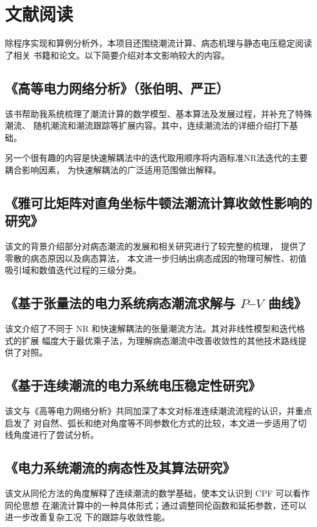 \section{文献阅读}
\label{sec:literature-review}

除程序实现和算例分析外，本项目还围绕潮流计算、病态机理与静态电压稳定阅读了相关
书籍和论文。以下简要介绍对本文影响较大的内容。

\subsection{《高等电力网络分析》（张伯明、严正）}

该书帮助我系统梳理了潮流计算的数学模型、基本算法及发展过程，并补充了特殊潮流、
随机潮流和潮流跟踪等扩展内容。其中，连续潮流法的详细介绍打下基础。

另一个很有趣的内容是快速解耦法中的迭代取用顺序将内涵标准NR法迭代的主要耦合影响因素，
为快速解耦法的广泛适用范围做出解释。

\subsection{《雅可比矩阵对直角坐标牛顿法潮流计算收敛性影响的研究》}

该文的背景介绍部分对病态潮流的发展和相关研究进行了较完整的梳理，
提供了零散的病态原因以及病态算法，
本文进一步归纳出病态成因的物理可解性、初值吸引域和数值迭代过程的三级分类。

\subsection{《基于张量法的电力系统病态潮流求解与 \(P\)--\(V\) 曲线》}

该文介绍了不同于 NR 和快速解耦法的张量潮流方法。其对非线性模型和迭代格式的扩展
幅度大于最优乘子法，为理解病态潮流中改善收敛性的其他技术路线提供了对照。

\subsection{《基于连续潮流的电力系统电压稳定性研究》}

该文与《高等电力网络分析》共同加深了本文对标准连续潮流流程的认识，并重点启发了
对自然、弧长和绝对角度等不同参数化方式的比较，本文进一步适用了切线角度进行了尝试分析。

\subsection{《电力系统潮流的病态性及其算法研究》}

该文从同伦方法的角度解释了连续潮流的数学基础，使本文认识到 CPF 可以看作同伦思想
在潮流计算中的一种具体形式；通过调整同伦函数和延拓参数，还可以进一步改善复杂工况
下的跟踪与收敛性能。
